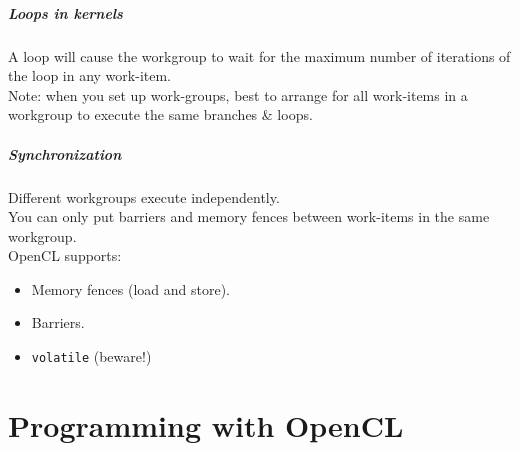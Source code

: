 \begin{frame}
  \frametitle{Loops in kernels}


      
    A loop will cause the workgroup to wait for the maximum number of
      iterations of the loop in any work-item.\\[1em]

  Note: when you set up work-groups, best to arrange for all work-items in
  a workgroup to execute the same branches \& loops.

\end{frame}

\begin{frame}
  \frametitle{Synchronization}



Different workgroups execute independently.\\
You can only put barriers and memory fences between work-items in the
      same workgroup.\\[1em]

OpenCL supports:
  \begin{itemize}
    \item Memory fences (load and store).
    \item Barriers.
    \item {\tt volatile} (beware!)
  \end{itemize}

\end{frame}

\part{Programming with OpenCL}
\frame{\partpage}


